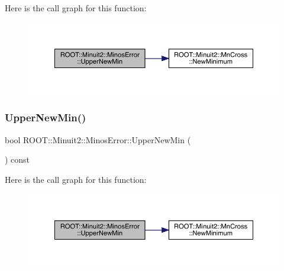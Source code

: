Here is the call graph for this function\+:
\nopagebreak
\begin{figure}[H]
\begin{center}
\leavevmode
\includegraphics[width=350pt]{d2/dd1/classROOT_1_1Minuit2_1_1MinosError_a5f37bb106903e148029b8461f9bbbe25_cgraph}
\end{center}
\end{figure}
\mbox{\label{classROOT_1_1Minuit2_1_1MinosError_a5f37bb106903e148029b8461f9bbbe25}} 
\subsubsection{\texorpdfstring{UpperNewMin()}{UpperNewMin()}\hspace{0.1cm}{\footnotesize\ttfamily [3/3]}}
{\footnotesize\ttfamily bool R\+O\+O\+T\+::\+Minuit2\+::\+Minos\+Error\+::\+Upper\+New\+Min (\begin{DoxyParamCaption}{ }\end{DoxyParamCaption}) const\hspace{0.3cm}{\ttfamily [inline]}}

Here is the call graph for this function\+:
\nopagebreak
\begin{figure}[H]
\begin{center}
\leavevmode
\includegraphics[width=350pt]{d2/dd1/classROOT_1_1Minuit2_1_1MinosError_a5f37bb106903e148029b8461f9bbbe25_cgraph}
\end{center}
\end{figure}
\mbox{\label{classROOT_1_1Minuit2_1_1MinosError_a89164c38dd7596c3164f1083eb9aac72}} 
